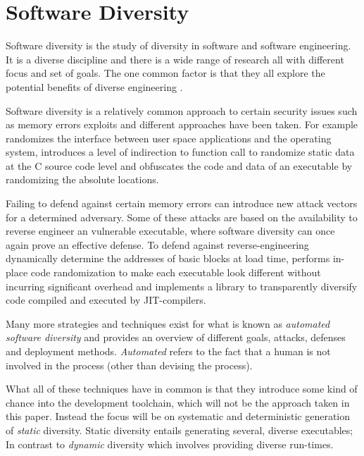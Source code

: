 \section{Software Diversity}

Software diversity is the study of diversity in software and software engineering. It is
a diverse discipline and there is a wide range of research all with different focus and
set of goals. The one common factor is that they all explore the potential benefits of
diverse engineering \cite{survey}.

Software diversity is a relatively common approach to certain security issues such as
memory errors exploits and different approaches have been taken. For example \textcite{os-randomization}
randomizes the interface between user space applications and the operating system, \textcite{mem-exploits}
introduces a level of indirection to function call to randomize static data at the C source
code level and \textcite{add-obfuscation} obfuscates the code and data of an executable by
randomizing the absolute locations.

Failing to defend against certain memory errors can introduce new attack vectors for a
determined adversary. Some of these attacks are based on the availability to reverse engineer
an vulnerable executable, where software diversity can once again prove an effective defense.
To defend against reverse-engineering \textcite{binary-stirring} dynamically determine the
addresses of basic blocks at load time, \textcite{smashing-gadgets} performs in-place code
randomization to make each executable look different without incurring significant overhead
and \textcite{librando} implements a library to transparently diversify code compiled and
executed by JIT-compilers.

Many more strategies and techniques exist for what is known as
\textit{automated software diversity} and \textcite{SoK} provides an overview of different
goals, attacks, defenses and deployment methods. \textit{Automated} refers to the fact that
a human is not involved in the process (other than devising the process).


What all of these techniques have in common is that they introduce some kind of chance into
the development toolchain, which will not be the approach taken in this paper. Instead
the focus will be on systematic and deterministic generation of \textit{static} diversity.
Static diversity entails generating several, diverse executables; In contrast to
\textit{dynamic} diversity which involves providing diverse run-times\cite{survey}.

